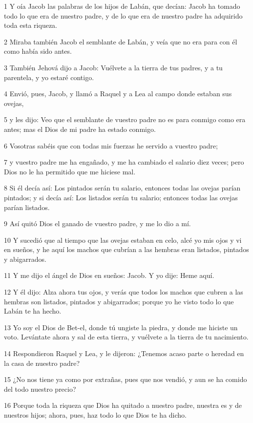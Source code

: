 \par 1 Y oía Jacob las palabras de los hijos de Labán, que decían: Jacob ha tomado todo lo que era de nuestro padre, y de lo que era de nuestro padre ha adquirido toda esta riqueza.
\par 2 Miraba también Jacob el semblante de Labán, y veía que no era para con él como había sido antes.
\par 3 También Jehová dijo a Jacob: Vuélvete a la tierra de tus padres, y a tu parentela, y yo estaré contigo.
\par 4 Envió, pues, Jacob, y llamó a Raquel y a Lea al campo donde estaban sus ovejas,
\par 5 y les dijo: Veo que el semblante de vuestro padre no es para conmigo como era antes; mas el Dios de mi padre ha estado conmigo.
\par 6 Vosotras sabéis que con todas mis fuerzas he servido a vuestro padre;
\par 7 y vuestro padre me ha engañado, y me ha cambiado el salario diez veces; pero Dios no le ha permitido que me hiciese mal.
\par 8 Si él decía así: Los pintados serán tu salario, entonces todas las ovejas parían pintados; y si decía así: Los listados serán tu salario; entonces todas las ovejas parían listados.
\par 9 Así quitó Dios el ganado de vuestro padre, y me lo dio a mí.
\par 10 Y sucedió que al tiempo que las ovejas estaban en celo, alcé yo mis ojos y vi en sueños, y he aquí los machos que cubrían a las hembras eran listados, pintados y abigarrados.
\par 11 Y me dijo el ángel de Dios en sueños: Jacob. Y yo dije: Heme aquí.
\par 12 Y él dijo: Alza ahora tus ojos, y verás que todos los machos que cubren a las hembras son listados, pintados y abigarrados; porque yo he visto todo lo que Labán te ha hecho.
\par 13 Yo soy el Dios de Bet-el, donde tú ungiste la piedra, y donde me hiciste un voto. Levántate ahora y sal de esta tierra, y vuélvete a la tierra de tu nacimiento.
\par 14 Respondieron Raquel y Lea, y le dijeron: ¿Tenemos acaso parte o heredad en la casa de nuestro padre?
\par 15 ¿No nos tiene ya como por extrañas, pues que nos vendió, y aun se ha comido del todo nuestro precio?
\par 16 Porque toda la riqueza que Dios ha quitado a nuestro padre, nuestra es y de nuestros hijos; ahora, pues, haz todo lo que Dios te ha dicho.

